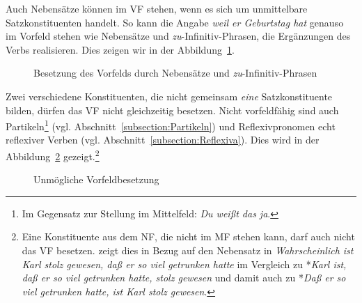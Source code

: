 Auch Nebensätze können im VF stehen, wenn es sich um unmittelbare Satzkonstituenten handelt. So kann \zB die Angabe \textit{weil er Geburtstag hat} genauso im Vorfeld stehen wie Nebensätze und \textit{zu}-Infinitiv-Phrasen, die Ergänzungen des Verbs realisieren. Dies zeigen wir in der Abbildung~\ref{fig:FeldermodelV2mitNeSaVF}.

\begin{figure}[!htbp]
  \centering
  \caption{Besetzung des Vorfelds durch Nebensätze und \textit{zu}-Infinitiv-Phrasen}
  \label{fig:FeldermodelV2mitNeSaVF}
\end{figure}

Zwei verschiedene Konstituenten, die nicht gemeinsam \textit{eine} Satzkonstituente bilden, dürfen das VF nicht gleichzeitig besetzen. Nicht vorfeldfähig sind auch Partikeln\footnote{Im Gegensatz zur Stellung im Mittelfeld: \textit{Du weißt das ja}.} (vgl. Abschnitt~\ref{subsection:Partikeln}) und Reflexivpronomen echt reflexiver Verben (vgl. Abschnitt~\ref{subsection:Reflexiva}). Dies wird in der Abbildung~\ref{fig:nichtVFfähig} gezeigt.\footnote{Eine Konstituente aus dem NF, die nicht im MF stehen kann, darf auch nicht das VF besetzen. \citet[291]{Hoehle19862018} zeigt dies in Bezug auf den Nebensatz in \textit{Wahrscheinlich ist Karl stolz gewesen, daß er so viel getrunken hatte} im Vergleich zu *\textit{Karl ist, daß er so viel getrunken hatte, stolz gewesen} und damit auch zu *\textit{Daß er so viel getrunken hatte, ist Karl stolz gewesen}.}   

\begin{figure}[!htbp]
  \centering
  \caption{Unmögliche Vorfeldbesetzung}
  \label{fig:nichtVFfähig}
\end{figure}

